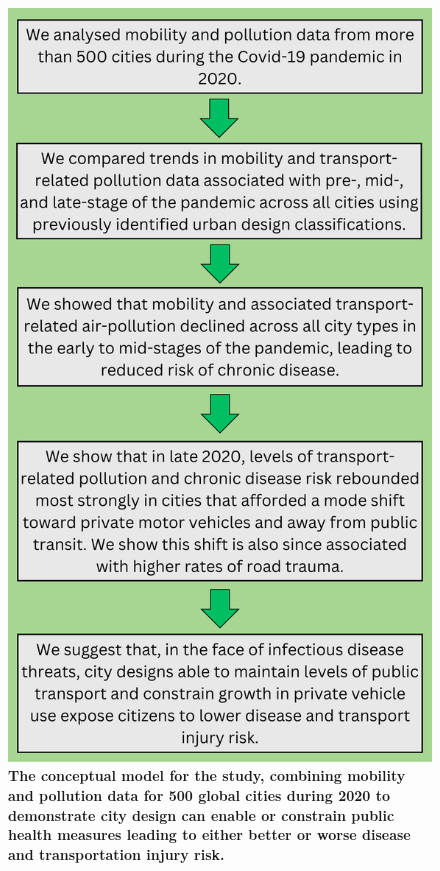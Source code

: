 \documentclass[preprint,10pt]{elsarticle} %
\begin{document}
\begin{figure}
\centering
\includegraphics[trim={ 0 0 0 0 },clip,scale=0.35]{Images/Panel LPH.png}
\caption{\bf The conceptual model for the study, combining mobility and pollution data for 500 global cities during 2020 to demonstrate city design can enable or constrain public health measures leading to either better or worse disease and transportation injury risk.}
 \label{fig:concept}
\end{figure}
\end{document}
